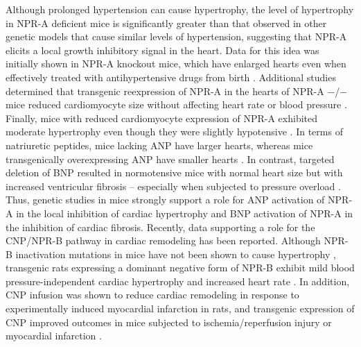 \documentclass[14pt,a4paper,onecolumn]{article}
\begin{document}
Although prolonged hypertension can cause hypertrophy, the level of hypertrophy in NPR-A deficient mice is significantly greater than that observed in other genetic models that cause similar levels of hypertension, suggesting that NPR-A elicits a local growth inhibitory signal in the heart. Data for this idea was initially shown in NPR-A knockout mice, which have enlarged hearts even when effectively treated with antihypertensive drugs from birth \citep{Knowles2001}. Additional studies determined that transgenic reexpression of NPR-A in the hearts of NPR-A −/− mice reduced cardiomyocyte size without affecting heart rate or blood pressure \citep{Kishimoto2001}.
Finally, mice with reduced cardiomyocyte expression of NPR-A exhibited moderate hypertrophy even though they were slightly hypotensive \citep{Holtwick2003} \citep{Patel2005}. In terms of natriuretic peptides, mice lacking ANP have larger hearts, whereas mice transgenically overexpressing ANP have smaller hearts \citep{Barbee1994} \citep{Steinhelper1990}.
In contrast, targeted deletion of BNP resulted in normotensive mice with normal heart size but with increased ventricular fibrosis – especially when subjected to pressure overload \citep{Tamura2000}. Thus, genetic studies in mice strongly support a role for ANP activation of NPR-A in the local inhibition of cardiac hypertrophy and BNP activation of NPR-A in the inhibition of cardiac fibrosis. Recently, data supporting a role for the CNP/NPR-B pathway in cardiac remodeling has been reported. Although NPR-B inactivation mutations in mice have not been shown to cause hypertrophy \citep{Tamura2004} \citep{Tsuji2005}, transgenic rats expressing a dominant negative form of NPR-B exhibit mild blood pressure-independent cardiac hypertrophy and increased heart rate \citep{Langenickel2006}.
In addition, CNP infusion was shown to reduce cardiac remodeling in response to experimentally induced myocardial infarction in rats, and transgenic expression of CNP improved outcomes in mice subjected to ischemia/reperfusion injury or myocardial infarction \citep{Wang2007}.
\end{document}
